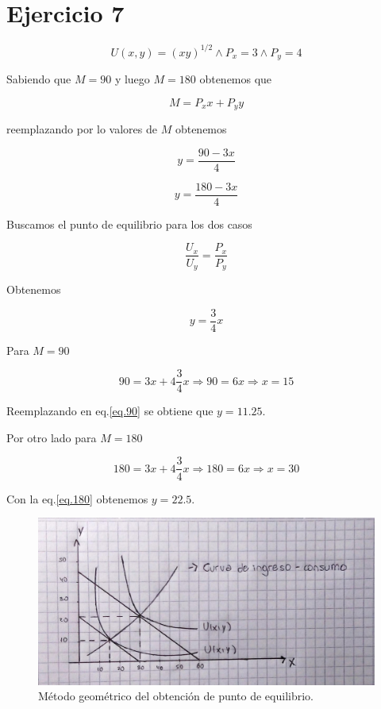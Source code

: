 \documentclass[letterpaper]{article}
\begin{document}
\section{Ejercicio 7}

\begin{equation}
U(x,y)=(xy)^{1/2} \land P_x=3 \land P_y=4
\end{equation}

Sabiendo que $M=90$ y luego $M=180$ obtenemos que 

\begin{equation}
M=P_xx+P_yy
\end{equation}

reemplazando por lo valores de $M$ obtenemos 

\begin{equation}
\label{eq.90}
y = \frac{90-3x}{4}
\end{equation}

\begin{equation}
\label{eq.180}
y = \frac{180-3x}{4}
\end{equation}

Buscamos el punto de equilibrio para los dos casos

\begin{equation}
\frac{U_x}{U_y}= \frac{P_x}{P_y}
\end{equation}

Obtenemos 

\begin{equation}
y= \frac{3}{4}x
\end{equation}

Para $M=90$

\begin{equation}
90=3x+4\frac{3}{4}x \Rightarrow 90=6x \Rightarrow x=15
\end{equation}

Reemplazando en eq.\ref{eq.90} se obtiene que $y=11.25$.

Por otro lado para $M=180$

\begin{equation}
180=3x+4\frac{3}{4}x \Rightarrow 180=6x \Rightarrow x=30
\end{equation}

Con la eq.\ref{eq.180} obtenemos $y=22.5$.

\newpage

\begin{figure}[h]
\centering
\includegraphics[width=\textwidth]{./Images/punto7.jpeg}
\caption{Método geométrico del obtención de punto de equilibrio.}
\end{figure}
\end{document}
